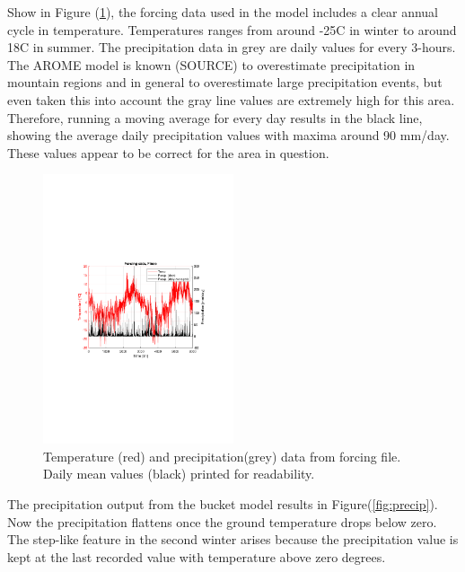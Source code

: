 \documentclass[a4paper,11pt,twocolumn]{article}
\begin{document}
Show in Figure (\ref{fig:forcing}), the forcing data used in the model includes a clear annual cycle in temperature. Temperatures ranges from around -25\textdegree C in winter to around 18\textdegree C in summer. The precipitation data in grey are daily values for every 3-hours. The AROME model is known (SOURCE) to overestimate precipitation in mountain regions and in general to overestimate large precipitation events, but even taken this into account the gray line values are extremely high for this area. Therefore, running a moving average for every day results in the black line, showing the average daily precipitation values with maxima around 90 mm/day. These values appear to be correct for the area in question.   

\begin{figure}[h]
	\centering 
	\includegraphics[width=0.5\textwidth]{figures/forcing_finse}
	\caption{Temperature (red) and precipitation(grey) data from forcing file. Daily mean values (black) printed for readability.}
	\label{fig:forcing}
\end{figure}

The precipitation output from the bucket model results in Figure(\ref{fig:precip}). Now the precipitation flattens once the ground temperature drops below zero. The step-like feature in the second winter arises because the precipitation value is kept at the last recorded value with temperature above zero degrees.
\end{document}
